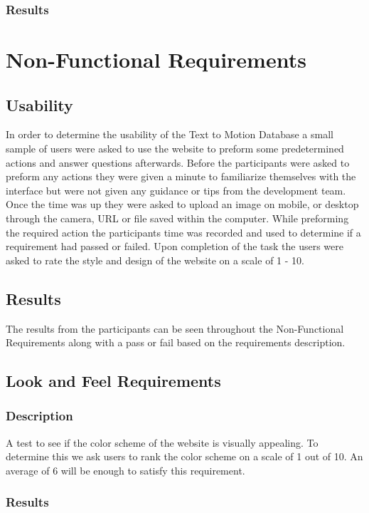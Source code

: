 \documentclass{scrreprt}
\begin{document}
\subsection{Results}

\chapter{Non-Functional Requirements}
\section{Usability}
\begin{flushleft}
In order to determine the usability of the Text to Motion Database a small sample of users were asked to use the website to preform some predetermined actions and answer questions afterwards. Before the participants were asked to preform any actions they were given a minute to familiarize themselves with the interface but were not given any guidance or tips from the development team. Once the time was up they were asked to upload an image on mobile, or desktop through the camera, URL or file saved within the computer. While preforming the required action the participants time was recorded and used to determine if a requirement had passed or failed. Upon completion of the task the users were asked to rate the style and design of the website on a scale of 1 - 10.
\end{flushleft}

\section{Results}
\begin{flushleft}
The results from the participants can be seen throughout the Non-Functional Requirements along with a pass or fail based on the requirements description.
\end{flushleft}

\section{Look and Feel Requirements}

\subsection{Description}
\begin{flushleft}
A test to see if the color scheme of the website is visually appealing. To determine this we ask users to rank the color scheme on a scale of 1 out of 10. An average of 6 will be enough to satisfy this requirement.
\subsection{Results}
\end{flushleft}
 
\end{document}
